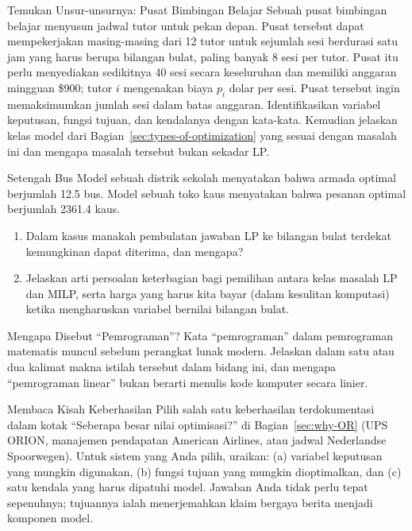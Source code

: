 \begin{ex}{Temukan Unsur-unsurnya: Pusat Bimbingan Belajar}{}
 Sebuah pusat bimbingan belajar menyusun jadwal tutor untuk pekan depan. Pusat tersebut dapat mempekerjakan masing-masing dari 12 tutor untuk sejumlah sesi berdurasi satu jam yang harus berupa bilangan bulat, paling banyak 8 sesi per tutor. Pusat itu perlu menyediakan sedikitnya 40 sesi secara keseluruhan dan memiliki anggaran mingguan \$900; tutor $i$ mengenakan biaya $p_i$ dolar per sesi. Pusat tersebut ingin memaksimumkan jumlah sesi dalam batas anggaran. Identifikasikan variabel keputusan, fungsi tujuan, dan kendalanya dengan kata-kata. Kemudian jelaskan kelas model dari Bagian~\ref{sec:types-of-optimization} yang sesuai dengan masalah ini dan mengapa masalah tersebut bukan sekadar LP.
\exrefs{\S\ref{sec:what-is-MP}, \S\ref{sec:types-of-optimization}}
\end{ex}


\begin{ex}{Setengah Bus}{}
 Model sebuah distrik sekolah menyatakan bahwa armada optimal berjumlah 12.5 bus. Model sebuah toko kaus menyatakan bahwa pesanan optimal berjumlah 2361.4 kaus.
\begin{enumerate}
\item Dalam kasus manakah pembulatan jawaban LP ke bilangan bulat terdekat kemungkinan dapat diterima, dan mengapa?
\item Jelaskan arti persoalan keterbagian bagi pemilihan antara kelas masalah LP dan MILP, serta harga yang harus kita bayar (dalam kesulitan komputasi) ketika mengharuskan variabel bernilai bilangan bulat.
\end{enumerate}
\exrefs{\S\ref{sec:types-of-optimization}, \S\ref{sec:intro-MILP}}
\end{ex}

\begin{ex}{Mengapa Disebut ``Pemrograman''?}{}
\label{ex:programming-term}
 Kata ``pemrograman'' dalam pemrograman matematis muncul sebelum perangkat lunak modern. Jelaskan dalam satu atau dua kalimat makna istilah tersebut dalam bidang ini, dan mengapa ``pemrograman linear'' bukan berarti menulis kode komputer secara linier.
\exrefs{\S\ref{sec:what-is-MP}}
\end{ex}

\begin{ex}{Membaca Kisah Keberhasilan}{}
 Pilih salah satu keberhasilan terdokumentasi dalam kotak ``Seberapa besar nilai optimisasi?'' di Bagian~\ref{sec:why-OR} (UPS ORION, manajemen pendapatan American Airlines, atau jadwal Nederlandse Spoorwegen). Untuk sistem yang Anda pilih, uraikan: (a) variabel keputusan yang mungkin digunakan, (b) fungsi tujuan yang mungkin dioptimalkan, dan (c) satu kendala yang harus dipatuhi model. Jawaban Anda tidak perlu tepat sepenuhnya; tujuannya ialah menerjemahkan klaim bergaya berita menjadi komponen model.
\exrefs{\S\ref{sec:why-OR}, \S\ref{sec:what-is-MP}}
\end{ex}

